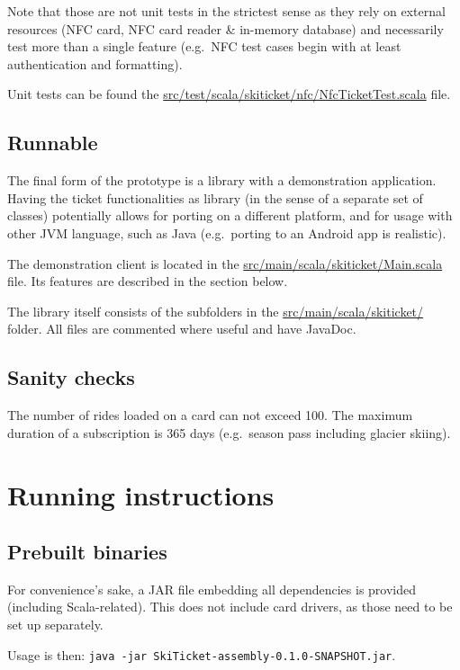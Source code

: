 \documentclass[paper=a4, fontsize=11pt]{scrartcl}
\begin{document}
Note that those are not unit tests in the strictest sense as they rely on
external resources (NFC card, NFC card reader \& in-memory database) and
necessarily test more than a single feature (e.g.\ NFC test cases begin with at
least authentication and formatting).

Unit tests can be found the 
\url{src/test/scala/skiticket/nfc/NfcTicketTest.scala} file.

\subsection{Runnable}

The final form of the prototype is a library with a demonstration application.
Having the ticket functionalities as library (in the sense of a separate set of
classes) potentially allows for porting on a different platform, and for usage
with other JVM language, such as Java (e.g.\ porting to an Android app is
realistic).

The demonstration client is located in the 
\url{src/main/scala/skiticket/Main.scala} file.
Its features are described in the section below.

The library itself consists of the subfolders in the
\url{src/main/scala/skiticket/} folder.
All files are commented where useful and have JavaDoc.

\subsection{Sanity checks}

The number of rides loaded on a card can not exceed 100.
The maximum duration of a subscription is 365 days (e.g.\ season pass including
glacier skiing).

\section{Running instructions}

\subsection{Prebuilt binaries}

For convenience's sake, a JAR file embedding all dependencies is provided
(including Scala-related).
This does not include card drivers, as those need to be set up separately.

Usage is then: \texttt{java -jar SkiTicket-assembly-0.1.0-SNAPSHOT.jar}.
\end{document}
